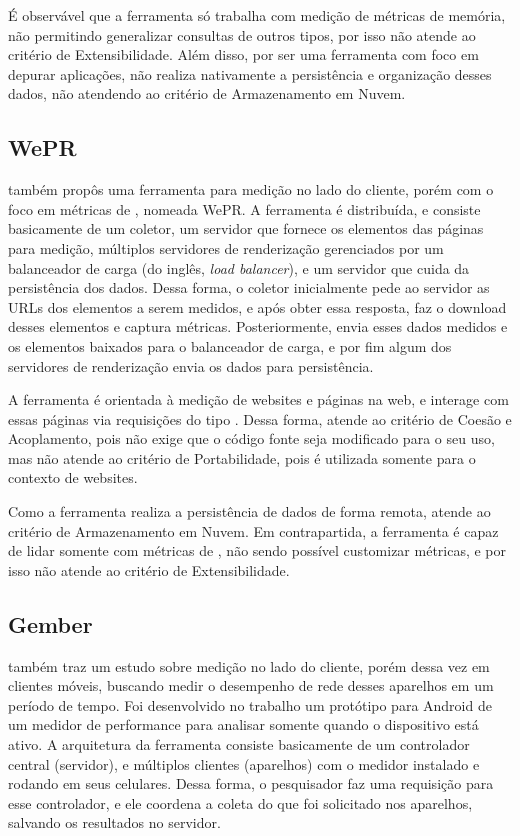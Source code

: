 \documentclass[12pt]{tcc}
\begin{document}
	É observável que a ferramenta só trabalha com medição de métricas de memória, não permitindo generalizar consultas de outros tipos, por isso não atende ao critério de Extensibilidade. Além disso, por ser uma ferramenta com foco em depurar aplicações, não realiza nativamente a persistência e organização desses dados, não atendendo ao critério de Armazenamento em Nuvem.		

	\subsection{WePR}
	\label{WePR}
	\par \citet{Asrese2019MeasuringWL} também propôs uma ferramenta para medição no lado do cliente, porém com o foco em métricas de , nomeada WePR. A ferramenta é distribuída, e consiste basicamente de um coletor, um servidor que fornece os elementos das páginas para medição, múltiplos servidores de renderização gerenciados por um balanceador de carga (do inglês, \emph{load balancer}), e um servidor que cuida da persistência dos dados. Dessa forma, o coletor inicialmente pede ao servidor as URLs dos elementos a serem medidos, e após obter essa resposta, faz o download desses elementos e captura métricas. Posteriormente, envia esses dados medidos e os elementos baixados para o balanceador de carga, e por fim algum dos servidores de renderização envia os dados para persistência. 

	A ferramenta é orientada à medição de websites e páginas na web, e interage com essas páginas via requisições do tipo . Dessa forma, atende ao critério de Coesão e Acoplamento, pois não exige que o código fonte seja modificado para o seu uso, mas não atende ao critério de Portabilidade, pois é utilizada somente para o contexto de websites.

	Como a ferramenta realiza a persistência de dados de forma remota, atende ao critério de Armazenamento em Nuvem. Em contrapartida, a ferramenta é capaz de lidar somente com métricas de , não sendo possível customizar métricas, e por isso não atende ao critério de Extensibilidade.

	\subsection{Gember}
	\par \citet{Gember2012Obtaining} também traz um estudo sobre medição no lado do cliente, porém dessa vez em clientes móveis, buscando medir o desempenho de rede desses aparelhos em um período de tempo. Foi desenvolvido no trabalho um protótipo para Android de um medidor de performance para analisar somente quando o dispositivo está ativo. A arquitetura da ferramenta consiste basicamente de um controlador central (servidor), e múltiplos clientes (aparelhos) com o medidor instalado e rodando em seus celulares. Dessa forma, o pesquisador faz uma requisição para esse controlador, e ele coordena a coleta do que foi solicitado nos aparelhos, salvando os resultados no servidor.
\end{document}

